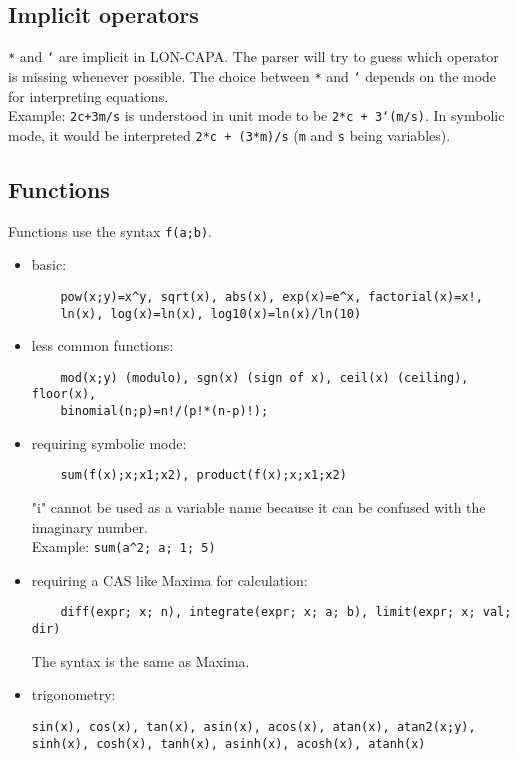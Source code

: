 \subsection{Implicit operators}
\texttt{*} and \texttt{`} are implicit in LON-CAPA.
The parser will try to guess which operator is missing whenever possible.
The choice between \texttt{*} and \texttt{`} depends on the mode for interpreting equations.\\
Example: \texttt{2c+3m/s} is understood in unit mode to be \texttt{2*c + 3`(m/s)}.
In symbolic mode, it would be interpreted \texttt{2*c + (3*m)/s} (\texttt{m} and \texttt{s} being variables).

\subsection{Functions}
Functions use the syntax \texttt{f(a;b)}.
\begin{itemize}
\item basic:
\begin{verbatim}
    pow(x;y)=x^y, sqrt(x), abs(x), exp(x)=e^x, factorial(x)=x!,
    ln(x), log(x)=ln(x), log10(x)=ln(x)/ln(10)
\end{verbatim}
\item less common functions:
\begin{verbatim}
    mod(x;y) (modulo), sgn(x) (sign of x), ceil(x) (ceiling), floor(x),
    binomial(n;p)=n!/(p!*(n-p)!);
\end{verbatim}
\item requiring symbolic mode:
\begin{verbatim}
    sum(f(x);x;x1;x2), product(f(x);x;x1;x2)
\end{verbatim}
"i" cannot be used as a variable name because it can be confused with the imaginary number.\\
Example: \texttt{sum(a\^{}2; a; 1; 5)}
\item requiring a CAS like Maxima for calculation:
\begin{verbatim}
    diff(expr; x; n), integrate(expr; x; a; b), limit(expr; x; val; dir)
\end{verbatim}
The syntax is the same as Maxima.
\item trigonometry:
\begin{verbatim}
sin(x), cos(x), tan(x), asin(x), acos(x), atan(x), atan2(x;y),
sinh(x), cosh(x), tanh(x), asinh(x), acosh(x), atanh(x)
\end{verbatim}
\end{itemize}

